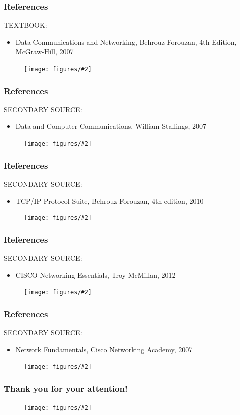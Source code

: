 \documentclass{beamer}
\newcommand{\fig}[2]{
\begin{center}
\begin{figure}
\texttt{[image: figures/\#2]}
\end{figure}
\end{center}
}
\begin{document}

\begin{frame}
\frametitle{References}
\Large
TEXTBOOK: 
\begin{itemize}
\item  <1-> Data Communications and Networking, Behrouz Forouzan, 4th Edition, McGraw-Hill, 2007
 \end{itemize}
\fig{0.3}{forouzan2007}
\end{frame}

\begin{frame}
\frametitle{References}
\Large
SECONDARY SOURCE: 
\begin{itemize}
\item  <1-> Data and Computer Communications, William Stallings, 2007
 \end{itemize}
\fig{0.3}{stallings2007}
\end{frame}
 

\begin{frame}
\frametitle{References}
\Large
SECONDARY SOURCE: 
\begin{itemize}
\item  <1-> TCP/IP Protocol Suite, Behrouz Forouzan, 4th edition, 2010
 \end{itemize}
\fig{0.3}{forouzantcpip}
\end{frame}


\begin{frame}
\frametitle{References}
\Large
SECONDARY SOURCE: 
\begin{itemize}
\item  <1-> CISCO Networking Essentials, Troy McMillan, 2012
 \end{itemize}
\fig{0.3}{mcmillan2012}
\end{frame}

\begin{frame}
\frametitle{References}
\Large
SECONDARY SOURCE: 
\begin{itemize}
\item  <1-> Network Fundamentals, Cisco Networking Academy, 2007
 \end{itemize}
\fig{0.4}{cisco}
\end{frame}


\begin{frame}
\frametitle{Thank you for your attention!}
\fig{0.6}{mthesis}
\end{frame}
\end{document}
